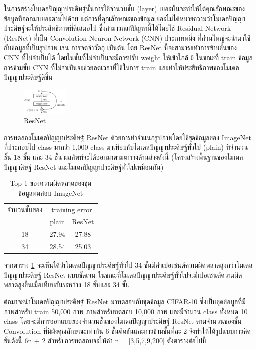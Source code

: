 ในการสร้างโมเดลปัญญาประดิษฐ์นั้นการใช้จำนวนชั้น (layer) เยอะนั้นจะทำให้ได้คุณลักษณะของข้อมูลที่ออกมาเยอะตามไปด้วย แต่การที่คุณลักษณะของข้อมูลเยอะไม่ได้หมายความว่าโมเดลปัญญาประดิษฐ์จะให้ประสิทธิภาพที่ดีเสมอไป ซึ่งสามารถแก้ปัญหานี้ได้โดยใช้ Residual Network (ResNet) ที่เป็น Convolution Neuron Network (CNN) ประเภทหนึ่ง ที่ส่วนใหญ่จะนำมาใช้กับข้อมูลที่เป็นรูปภาพ เช่น การจดจำวัตถุ เป็นต้น โดย ResNet นี้จะสามารถทำการข้ามชั้นของ CNN ที่ไม่จำเป็นได้ โดยในชั้นที่ไม่จำเป็นจะมีการปรับ weight ให้เข้าใกล้ 0 ในขณะที่ train ข้อมูล การข้ามชั้น CNN ที่ไม่จำเป็นจะช่วยลดเวลาที่ใช้ในการ train และทำให้ประสิทธิภาพของโมเดลปัญญาประดิษฐ์ดีขึ้น

\begin{figure}[!ht]
	\centering
	\includegraphics[width=0.2\textwidth]{chapter2/images/example_resnet.png}
		\caption{ResNet}
    	\label{fig:ResNet}
\end{figure}

การทดลองโมเดลปัญญาประดิษฐ์ ResNet ด้วยการทำจำแนกรูปภาพโดยใช้ชุดข้อมูลของ ImageNet ที่ประกอบไป class มากว่า 1,000 class มาเทียบกับโมเดลปัญญาประดิษฐ์ทั่วไป (plain) ที่จำนวนชั้น 18 ชั้น และ 34 ชั้น ผลลัพท์จะได้ออกมาตามตารางด้านล่างดังนี้ (โครงสร้างพื้นฐานของโมเดลปัญญาดิษฐ์ ResNet และโมเดลปัญญาประดิษฐ์ทั่วไปเหมือนกัน)

\begin{table}[!ht]
	\centering
	\begin{tabular}{|c|c|c|}
		\hline
		{จำนวนชั้นของ}&\multicolumn{2}{c|}{training error}\\
		\cline{2-3}
		{}							& plain						& ResNet				\\
		\hline
		18							& 27.94						& 27.88				\\
		34							& 28.54						& 25.03				\\
		\hline
	\end{tabular}
	\caption{Top-1 ของความผิดพลาดของชุดข้อมูลทดสอบ ImageNet}
	\label{tab: Top-1 error of ImageNet}
\end{table}

จากตาราง \ref{tab: Top-1 error of ImageNet} จะเห็นได้ว่าโมเดลปัญญาประดิษฐ์ทั่วไป 34 ชั้นมีค่าเปอเซนต์ความผิดพลาดสูงกว่าโมเดลปัญญาประดิษฐ์ ResNet แบบชัดเจน ในขณะที่โมเดลปัญญาประดิษฐ์ทั่วไปจะมีเปอเซนต์ความผิดพลาดสูงขึ้นเมื่อเทียบกันระหว่าง 18 ชั้นและ 34 ชั้น
\par
ต่อมาจะนำโมเดลปัญญาประดิษฐ์ ResNet มาทดสอบกับชุดข้อมูล CIFAR-10 ซึ่งเป็นชุดข้อมูลที่มีภาพสำหรับ train 50,000 ภาพ ภาพสำหรับทดสอบ 10,000 ภาพ และมีจำนวน class ทั้งหมด 10 class โดยจะมีการออกแบบของจำนวนชั้นของโมเดลปัญญาประดิษฐ์ ResNet ตามจำนวนของชั้น Convolution ที่มีผังคุณลักษณะเท่ากัน 6 ชั้นติดกันและการข้ามชั้นที่ละ 2 จึงทำให้ได้รูปแบบการคิดชั้นดังนี้ 6n + 2 สำหรับการทดสอบจะให้ค่า n = [3,5,7,9,200] ดังตารางต่อไปนี้

